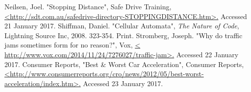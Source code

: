 \documentclass[a4paper]{article}
\begin{document}
	\newpage
	
	\begin{thebibliography}{0}
		 Neilsen, Joel. "Stopping Distance", Safe Drive Training,  \url{<http://sdt.com.au/safedrive-directory-STOPPINGDISTANCE.htm>.} Accessed 21 January 2017. 
		\bibitem{} Shiffman, Daniel. "Cellular Automata", \textit{The Nature of Code}, Lightning Source Inc, 2008. 323-354. Print.
		 Stromberg, Joseph. "Why do traffic jams sometimes form for no reason?", Vox, \url{< http://www.vox.com/2014/11/24/7276027/traffic-jam>.} Accessed 22 January 2017. 
		 Consumer Reports, "Best \& Worst Car Acceleration", Consumer Reports, \url{<http://www.consumerreports.org/cro/news/2012/05/best-worst-acceleration/index.htm>.} Accessed 23 January 2017.
	\end{thebibliography}
	
\end{document}
